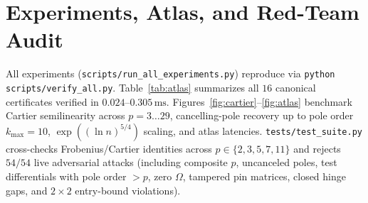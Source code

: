 \documentclass[10pt,twocolumn]{article}
\begin{document}
\section{Experiments, Atlas, and Red-Team Audit}\label{sec:experiments}
All experiments (\texttt{scripts/run\_all\_experiments.py}) reproduce via \texttt{python scripts/verify\_all.py}. Table~\ref{tab:atlas} summarizes all $16$ canonical certificates verified in $0.024$--$0.305\,\mathrm{ms}$. Figures~\ref{fig:cartier}--\ref{fig:atlas} benchmark Cartier semilinearity across $p=3\dots 29$, cancelling-pole recovery up to pole order $k_{\max}=10$, $\exp((\ln n)^{5/4})$ scaling, and atlas latencies. \texttt{tests/test\_suite.py} cross-checks Frobenius/Cartier identities across $p\in\{2,3,5,7,11\}$ and rejects $54/54$ live adversarial attacks (including composite $p$, uncanceled poles, test differentials with pole order $>p$, zero $\Omega$, tampered pin matrices, closed hinge gaps, and $2\times 2$ entry-bound violations).
\end{document}
